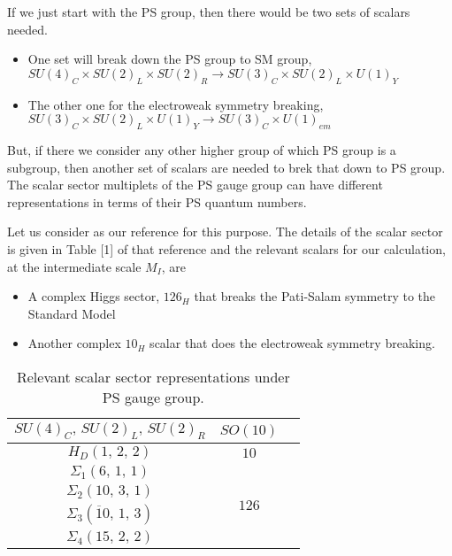 \documentclass[11pt,prd,superscriptaddress,nofootinbib]{revtex4-1}
\def\sbar{\overline}
\numberwithin{equation}{section}
\begin{document}
If we just start with the PS group, then there would be two sets of scalars needed. 
\begin{itemize}
\item One set will break down the PS group to SM group, $ SU(4)_C\times SU(2)_L\times SU(2)_R \rightarrow SU(3)_C\times SU(2)_L\times U(1)_Y $
\item The other one for the electroweak symmetry breaking, $SU(3)_C\times SU(2)_L\times U(1)_Y \rightarrow SU(3)_C\times U(1)_{em} $ 
\end{itemize} 
But, if there we consider any other higher group of which PS group is a subgroup, then another set of scalars are needed to brek that down to PS group.
The scalar sector multiplets of the PS gauge group can have different representations  in terms of their PS quantum numbers. 


\noindent
Let us consider \cite{Babu:2015bna} as our reference for this purpose. The details of the scalar sector is given in Table [1] of that reference and the relevant scalars for our calculation, at the intermediate scale $M_I$, are 
\begin{itemize}
\item A complex Higgs sector, $126_H$ that breaks the Pati-Salam symmetry to the Standard Model
\item Another complex $10_H$ scalar that does the electroweak symmetry breaking.
\end{itemize}

\begin{table}[H]
\settowidth{\mylen}{Names}
\begin{center}
\begin{tabular}{|c|c|c|}
\hline
$SU(4)_C ,\, SU(2)_L ,\, SU(2)_R$ & $SO(10)$
\\  \hline\hline
$H_D (1,\,2,\,2)$ & $10$\\
 \hline
 $\Sigma_1(6,\,1,\,1)$  &  \multirow{4}{*}{$126$}
\\  $\Sigma_2(10,\,3,\,1)$ &  \\ 
$\Sigma_3(\sbar 10,\,1,\,3)$ & \\ 
$\Sigma_4(15,\,2,\,2)$ & \\ \hline
\end{tabular}
\caption{Relevant scalar sector representations under PS gauge group.\label{tab:PSparticle}}
\vspace{-0.6cm}
\end{center}
\end{table}
\end{document}
